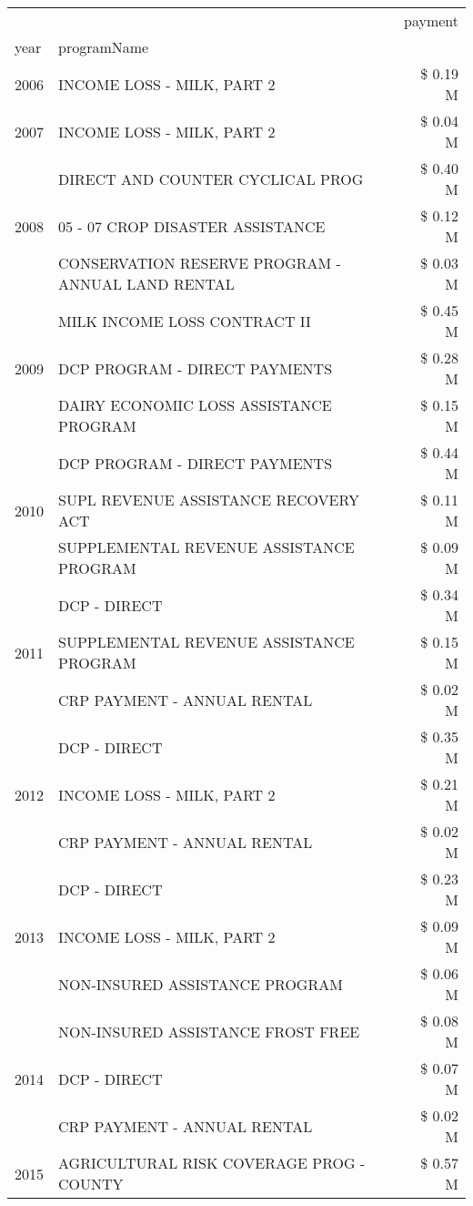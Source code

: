 \begin{tabular}{llr}
\toprule
 &  & payment \\
year & programName &  \\
\midrule
2006 & INCOME LOSS - MILK, PART 2 & \$ 0.19 M \\
\cline{1-3}
2007 & INCOME LOSS - MILK, PART 2 & \$ 0.04 M \\
\cline{1-3}
\multirow[t]{3}{*}{2008} & DIRECT AND COUNTER CYCLICAL PROG & \$ 0.40 M \\
 & 05 - 07 CROP DISASTER ASSISTANCE & \$ 0.12 M \\
 & CONSERVATION RESERVE PROGRAM - ANNUAL LAND RENTAL & \$ 0.03 M \\
\cline{1-3}
\multirow[t]{3}{*}{2009} & MILK INCOME LOSS CONTRACT II & \$ 0.45 M \\
 & DCP PROGRAM - DIRECT PAYMENTS & \$ 0.28 M \\
 & DAIRY ECONOMIC LOSS ASSISTANCE PROGRAM & \$ 0.15 M \\
\cline{1-3}
\multirow[t]{3}{*}{2010} & DCP PROGRAM - DIRECT PAYMENTS & \$ 0.44 M \\
 & SUPL REVENUE ASSISTANCE RECOVERY ACT & \$ 0.11 M \\
 & SUPPLEMENTAL REVENUE ASSISTANCE PROGRAM & \$ 0.09 M \\
\cline{1-3}
\multirow[t]{3}{*}{2011} & DCP - DIRECT & \$ 0.34 M \\
 & SUPPLEMENTAL REVENUE ASSISTANCE PROGRAM & \$ 0.15 M \\
 & CRP PAYMENT - ANNUAL RENTAL & \$ 0.02 M \\
\cline{1-3}
\multirow[t]{3}{*}{2012} & DCP - DIRECT & \$ 0.35 M \\
 & INCOME LOSS - MILK, PART 2 & \$ 0.21 M \\
 & CRP PAYMENT - ANNUAL RENTAL & \$ 0.02 M \\
\cline{1-3}
\multirow[t]{3}{*}{2013} & DCP - DIRECT & \$ 0.23 M \\
 & INCOME LOSS - MILK, PART 2 & \$ 0.09 M \\
 & NON-INSURED ASSISTANCE PROGRAM & \$ 0.06 M \\
\cline{1-3}
\multirow[t]{3}{*}{2014} & NON-INSURED ASSISTANCE FROST FREE & \$ 0.08 M \\
 & DCP - DIRECT & \$ 0.07 M \\
 & CRP PAYMENT - ANNUAL RENTAL & \$ 0.02 M \\
\cline{1-3}
\multirow[t]{3}{*}{2015} & AGRICULTURAL RISK COVERAGE PROG - COUNTY & \$ 0.57 M \\

\end{tabular}
